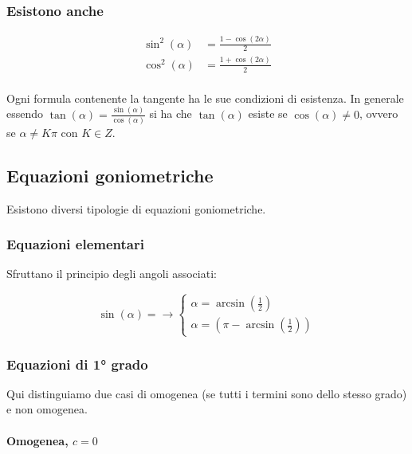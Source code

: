 \subsubsection*{Esistono anche}
\begin{align}
    \sin^2(\alpha) & = \frac{1-\cos(2\alpha)}{2}
    \label{eq:goniometria_formule_seno_al_quadrato}   \\
    \cos^2(\alpha) & = \frac{1+\cos(2\alpha)}{2}
    \label{eq:goniometria_formule_coseno_al_quadrato} \\
\end{align}

Ogni formula contenente la tangente ha le sue condizioni di esistenza.
In generale essendo $\tan(\alpha)=\frac{\sin(\alpha)}{\cos(\alpha)}$ si ha che $\tan(\alpha)$ esiste se $\cos(\alpha)\neq0$, ovvero se $\alpha\neq K\pi$ con $K \in Z$.


\subsection{Equazioni goniometriche}

Esistono diversi tipologie di equazioni goniometriche.

\subsubsection{Equazioni elementari}

Sfruttano il principio degli angoli associati:

\begin{equation}
    \sin(\alpha)= \rightarrow
    \begin{cases}
        \alpha=\arcsin(\frac{1}{2}) \\
        \alpha=(\pi-\arcsin(\frac{1}{2}))
    \end{cases}
\end{equation}

\subsubsection{Equazioni di 1° grado}

Qui distinguiamo due casi di omogenea (se tutti i termini sono dello stesso grado) e non omogenea.

\paragraph{Omogenea, $c = 0$}

